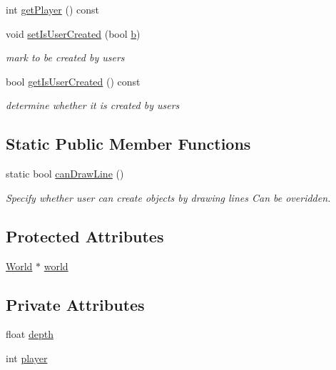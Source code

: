 \begin{DoxyCompactItemize}
int \hyperlink{classMatter_a5942bf485f1c095b0abd79ea13239cc7}{get\+Player} () const 
\item 
void \hyperlink{classMatter_a72a6f33a55d6df477dc8e684924bee55}{set\+Is\+User\+Created} (bool \hyperlink{image_8h_ab2d05693952610f937e5acb3c4a8fa1b}{b})
\begin{DoxyCompactList}\small\item\em mark to be created by users \end{DoxyCompactList}\item 
bool \hyperlink{classMatter_ac46cc6630fca6195dc0cd455505a8d84}{get\+Is\+User\+Created} () const 
\begin{DoxyCompactList}\small\item\em determine whether it is created by users \end{DoxyCompactList}\end{DoxyCompactItemize}
\subsection*{Static Public Member Functions}
\begin{DoxyCompactItemize}
\item 
static bool \hyperlink{classMatter_afe85d0688495f35bfe2cf4443c5fc34f}{can\+Draw\+Line} ()
\begin{DoxyCompactList}\small\item\em Specify whether user can create objects by drawing lines Can be overidden. \end{DoxyCompactList}\end{DoxyCompactItemize}
\subsection*{Protected Attributes}
\begin{DoxyCompactItemize}
\item 
\hyperlink{classWorld}{World} $\ast$ \hyperlink{classMatter_abdc5b13e2427e41c45af024acae015f1}{world}
\end{DoxyCompactItemize}
\subsection*{Private Attributes}
\begin{DoxyCompactItemize}
\item 
float \hyperlink{classMatter_ae6c374ad27e583eb3a675350914394ae}{depth}
\item 
int \hyperlink{classMatter_a702c712519468f6f68bc945f771c5044}{player}
\end{DoxyCompactItemize}


